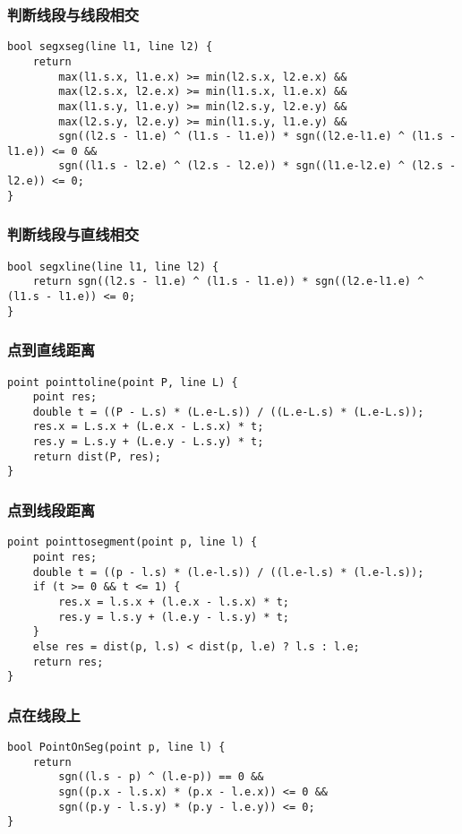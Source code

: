 \documentclass[a4paper]{article}
\begin{document}
\subsubsection{判断线段与线段相交}
\begin{lstlisting}
bool segxseg(line l1, line l2) {
    return
        max(l1.s.x, l1.e.x) >= min(l2.s.x, l2.e.x) &&
        max(l2.s.x, l2.e.x) >= min(l1.s.x, l1.e.x) &&
        max(l1.s.y, l1.e.y) >= min(l2.s.y, l2.e.y) &&
        max(l2.s.y, l2.e.y) >= min(l1.s.y, l1.e.y) &&
        sgn((l2.s - l1.e) ^ (l1.s - l1.e)) * sgn((l2.e-l1.e) ^ (l1.s - l1.e)) <= 0 &&
        sgn((l1.s - l2.e) ^ (l2.s - l2.e)) * sgn((l1.e-l2.e) ^ (l2.s - l2.e)) <= 0;
}
\end{lstlisting}
\subsubsection{判断线段与直线相交}
\begin{lstlisting}
bool segxline(line l1, line l2) {
	return sgn((l2.s - l1.e) ^ (l1.s - l1.e)) * sgn((l2.e-l1.e) ^ (l1.s - l1.e)) <= 0;
}
\end{lstlisting}
\subsubsection{点到直线距离}
\begin{lstlisting}
point pointtoline(point P, line L) {
	point res;
	double t = ((P - L.s) * (L.e-L.s)) / ((L.e-L.s) * (L.e-L.s)); 
	res.x = L.s.x + (L.e.x - L.s.x) * t;
	res.y = L.s.y + (L.e.y - L.s.y) * t;
	return dist(P, res);
}
\end{lstlisting}
\subsubsection{点到线段距离}
\begin{lstlisting}
point pointtosegment(point p, line l) {
	point res;
	double t = ((p - l.s) * (l.e-l.s)) / ((l.e-l.s) * (l.e-l.s));
	if (t >= 0 && t <= 1) {
		res.x = l.s.x + (l.e.x - l.s.x) * t;
		res.y = l.s.y + (l.e.y - l.s.y) * t;
	}
	else res = dist(p, l.s) < dist(p, l.e) ? l.s : l.e;
	return res;
}
\end{lstlisting}
\subsubsection{点在线段上}
\begin{lstlisting}
bool PointOnSeg(point p, line l) {
	return
	    sgn((l.s - p) ^ (l.e-p)) == 0 &&
	    sgn((p.x - l.s.x) * (p.x - l.e.x)) <= 0 &&
	    sgn((p.y - l.s.y) * (p.y - l.e.y)) <= 0;
}
\end{lstlisting}
\end{document}
